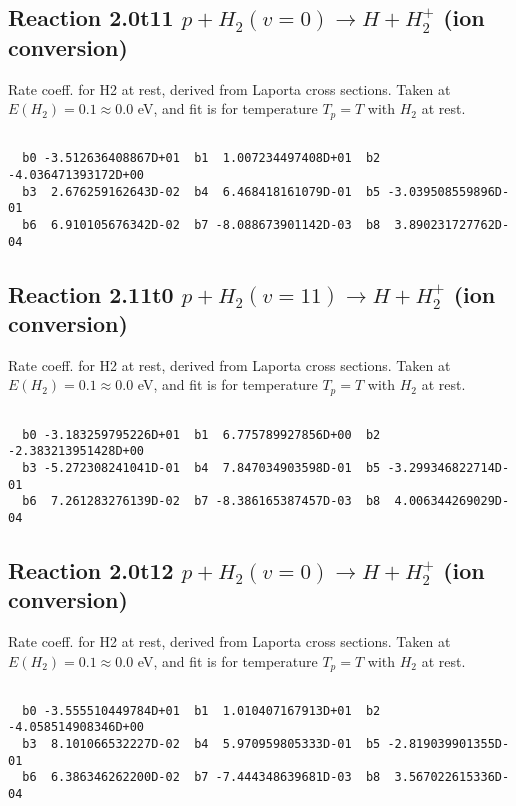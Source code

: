 \documentclass[12pt,dvipdfmx]{article}
\begin{document}
\newpage
\subsection{
Reaction 2.0t11
$ p + H_2(v=0) \rightarrow H + H_2^+$ (ion conversion)
}
Rate coeff. for H2 at rest, derived from Laporta cross sections.
Taken at $E(H_2) = 0.1 \approx 0.0$ eV,  and fit is for temperature $T_p=T$ with $H_2$ at rest.

\begin{small}\begin{verbatim}

  b0 -3.512636408867D+01  b1  1.007234497408D+01  b2 -4.036471393172D+00
  b3  2.676259162643D-02  b4  6.468418161079D-01  b5 -3.039508559896D-01
  b6  6.910105676342D-02  b7 -8.088673901142D-03  b8  3.890231727762D-04

\end{verbatim}\end{small}

\newpage
\subsection{
Reaction 2.11t0
$ p + H_2(v=11) \rightarrow H + H_2^+$ (ion conversion)
}
Rate coeff. for H2 at rest, derived from Laporta cross sections.
Taken at $E(H_2) = 0.1 \approx 0.0$ eV,  and fit is for temperature $T_p=T$ with $H_2$ at rest.

\begin{small}\begin{verbatim}

  b0 -3.183259795226D+01  b1  6.775789927856D+00  b2 -2.383213951428D+00
  b3 -5.272308241041D-01  b4  7.847034903598D-01  b5 -3.299346822714D-01
  b6  7.261283276139D-02  b7 -8.386165387457D-03  b8  4.006344269029D-04

\end{verbatim}\end{small}

\newpage
\subsection{
Reaction 2.0t12
$ p + H_2(v=0) \rightarrow H + H_2^+$ (ion conversion)
}
Rate coeff. for H2 at rest, derived from Laporta cross sections.
Taken at $E(H_2) = 0.1 \approx 0.0$ eV,  and fit is for temperature $T_p=T$ with $H_2$ at rest.

\begin{small}\begin{verbatim}

  b0 -3.555510449784D+01  b1  1.010407167913D+01  b2 -4.058514908346D+00
  b3  8.101066532227D-02  b4  5.970959805333D-01  b5 -2.819039901355D-01
  b6  6.386346262200D-02  b7 -7.444348639681D-03  b8  3.567022615336D-04

\end{verbatim}\end{small}
\end{document}
